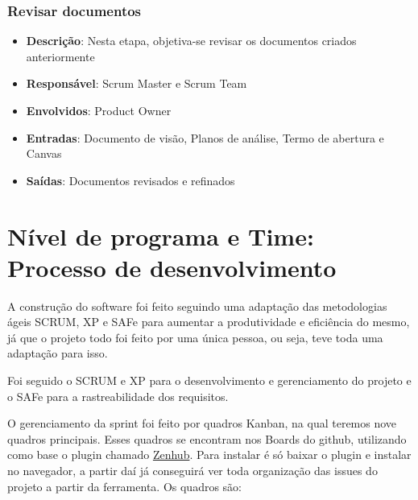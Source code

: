 \subsubsection{Revisar documentos}

\begin{itemize}
  \item \textbf{Descrição}: Nesta etapa, objetiva-se revisar os documentos criados anteriormente
  \item \textbf{Responsável}: Scrum Master e Scrum Team
  \item \textbf{Envolvidos}: Product Owner
  \item \textbf{Entradas}: Documento de visão, Planos de análise, Termo de abertura e Canvas
  \item \textbf{Saídas}: Documentos revisados e refinados
\end{itemize}

\section{Nível de programa e Time: Processo de desenvolvimento}

A construção do software foi feito seguindo uma adaptação das metodologias ágeis SCRUM, XP e SAFe para aumentar a produtividade e eficiência do mesmo, já que o projeto todo foi feito por uma única pessoa, ou seja, teve toda uma adaptação para isso.

Foi seguido o SCRUM e XP para o desenvolvimento e gerenciamento do projeto e o SAFe para a rastreabilidade dos requisitos.

O gerenciamento da sprint foi feito por quadros Kanban, na qual teremos nove quadros principais. Esses quadros se encontram nos Boards do github, utilizando como base o plugin chamado \href{https://www.zenhub.com/}{Zenhub}. Para instalar é só baixar o plugin e instalar no navegador, a partir daí já conseguirá ver toda organização das issues do projeto a partir da ferramenta. Os quadros são:

